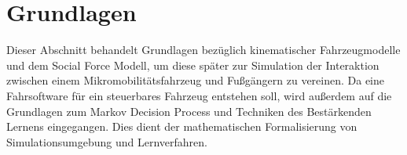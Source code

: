 
\cleardoublepage
\chapter{Grundlagen}\label{ch:Basics}

Dieser Abschnitt behandelt Grundlagen bezüglich kinematischer Fahrzeugmodelle und
dem Social Force Modell, um diese später zur Simulation der Interaktion zwischen
einem Mikromobilitätsfahrzeug und Fußgängern zu vereinen. Da eine Fahrsoftware für
ein steuerbares Fahrzeug entstehen soll, wird außerdem auf die Grundlagen zum Markov
Decision Process und Techniken des Bestärkenden Lernens eingegangen. Dies dient der
mathematischen Formalisierung von Simulationsumgebung und Lernverfahren.




